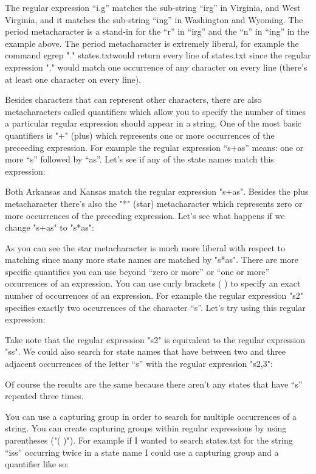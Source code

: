 The regular expression “i.g” matches the sub-string “irg” in Virginia, and West Virginia, and it matches the sub-string “ing” in Washington and Wyoming. The period metacharacter is a stand-in for the “r” in “irg” and the “n” in “ing” in the example above. The period metacharacter is extremely liberal, for example the command egrep "." states.txtwould return every line of states.txt since the regular expression "." would match one occurrence of any character on every line (there’s at least one character on every line).

Besides characters that can represent other characters, there are also metacharacters called quantifiers which allow you to specify the number of times a particular regular expression should appear in a string. One of the most basic quantifiers is "+" (plus) which represents one or more occurrences of the preceeding expression. For example the regular expression “s+as” means: one or more “s” followed by “as”. Let’s see if any of the state names match this expression:

Both Arkansas and Kansas match the regular expression "s+as". Besides the plus metacharacter there’s also the "*" (star) metacharacter which represents zero or more occurrences of the preceding expression. Let’s see what happens if we change "s+as" to "s*as":

As you can see the star metacharacter is much more liberal with respect to matching since many more state names are matched by "s*as". There are more specific quantifies you can use beyond “zero or more” or “one or more” occurrences of an expression. You can use curly brackets ({ }) to specify an exact number of occurrences of an expression. For example the regular expression "s{2}" specifies exactly two occurrences of the character “s”. Let’s try using this regular expression:

Take note that the regular expression "s{2}" is equivalent to the regular expression "ss". We could also search for state names that have between two and three adjacent occurrences of the letter “s” with the regular expression "s{2,3}":

Of course the results are the same because there aren’t any states that have “s” repeated three times.

You can use a capturing group in order to search for multiple occurrences of a string. You can create capturing groups within regular expressions by using parentheses ("( )"). For example if I wanted to search states.txt for the string “iss” occurring twice in a state name I could use a capturing group and a quantifier like so:

